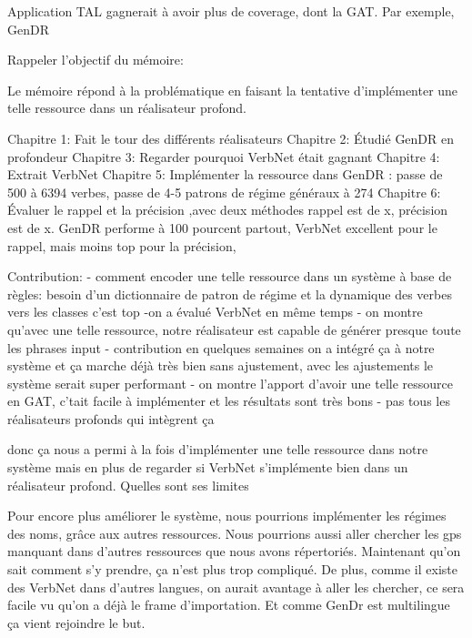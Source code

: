 Application TAL gagnerait à avoir plus de coverage, dont la GAT. Par exemple, GenDR

Rappeler l'objectif du mémoire:

Le mémoire répond à la problématique en faisant la tentative d'implémenter une telle ressource dans un réalisateur profond.

Chapitre 1: Fait le tour des différents réalisateurs
Chapitre 2: Étudié GenDR en profondeur
Chapitre 3: Regarder pourquoi VerbNet était gagnant
Chapitre 4: Extrait VerbNet
Chapitre 5: Implémenter la ressource dans GenDR : passe de 500 à 6394 verbes, passe de 4-5 patrons de régime généraux à 274	
Chapitre 6: Évaluer le rappel et la précision ,avec deux méthodes rappel est de x, précision est de x. GenDR performe à 100 pourcent partout, VerbNet excellent pour le rappel, mais moins top pour la précision, 

Contribution:
- comment encoder une telle ressource dans un système à base de règles: besoin d'un dictionnaire de patron de régime et la dynamique des verbes vers les classes c'est top
-on a évalué VerbNet en même temps
- on montre qu'avec une telle ressource, notre réalisateur est capable de générer presque toute les phrases input
- contribution en quelques semaines on a intégré ça à notre système et ça marche déjà très bien sans ajustement, avec les ajustements le système serait super performant
- on montre l'apport d'avoir une telle ressource en GAT, c'tait facile à implémenter et les résultats sont très bons
- pas tous les réalisateurs profonds qui intègrent ça

donc ça nous a permi à la fois d'implémenter une telle ressource dans notre système mais en plus de regarder si VerbNet s'implémente bien dans un réalisateur profond. Quelles sont ses limites

Pour encore plus améliorer le système, nous pourrions implémenter les régimes des noms, grâce aux autres ressources. Nous pourrions aussi aller chercher les gps manquant dans d'autres ressources que nous avons répertoriés. Maintenant qu'on sait comment s'y prendre, ça n'est plus trop compliqué. De plus, comme il existe des VerbNet dans d'autres langues, on aurait avantage à aller les chercher, ce sera facile vu qu'on a déjà le frame d'importation. Et comme GenDr est multilingue ça vient rejoindre le but.


